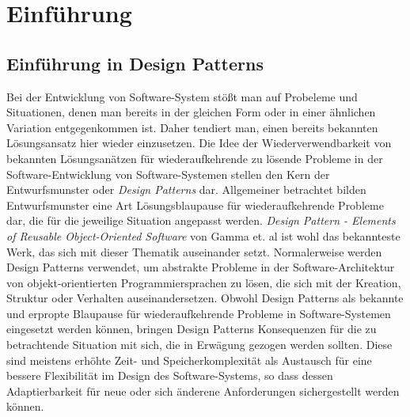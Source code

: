\chapter*{Einführung}

\section*{Einführung in Design Patterns}

Bei der Entwicklung von Software-System stößt man auf Probeleme und Situationen, denen man bereits in der gleichen Form oder in einer ähnlichen Variation entgegenkommen ist.
Daher tendiert man, einen bereits bekannten Lösungsansatz hier wieder einzusetzen. Die Idee der Wiederverwendbarkeit von bekannten Lösungsanätzen für wiederaufkehrende zu lösende Probleme in der Software-Entwicklung
von Software-Systemen stellen den Kern der Entwurfsmunster oder \textit{Design Patterns} dar. Allgemeiner betrachtet bilden Entwurfsmunster eine Art Lösungsblaupause für wiederaufkehrende Probleme dar, die für die jeweilige Situation angepasst werden.
 \textit{Design Pattern - Elements of Reusable Object-Oriented Software} von Gamma et. al \cite{gamma1994design} ist wohl das bekannteste Werk, das sich mit dieser Thematik auseinander setzt.
Normalerweise werden Design Patterns verwendet, um abstrakte Probleme in der Software-Architektur von objekt-orientierten Programmiersprachen zu lösen, die sich mit der Kreation, Struktur oder Verhalten auseinandersetzen.
Obwohl Design Patterns als bekannte und erpropte Blaupause für wiederaufkehrende Probleme in Software-Systemen eingesetzt werden können, bringen Design Patterns Konsequenzen für die zu betrachtende Situation mit sich,
die in Erwägung gezogen werden sollten. Diese sind meistens erhöhte Zeit- und Speicherkomplexität als Austausch für eine bessere Flexibilität im Design des Software-Systems, so dass dessen Adaptierbarkeit für neue oder sich änderene Anforderungen sichergestellt werden können.

